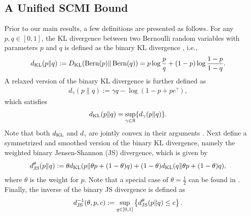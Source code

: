 \documentclass[onecolumn,romanappendices,10pt]{IEEEtran}
\newcommand{\RR}{{\mathbb{R}}}
\DeclareMathOperator{\Bernoulli}{Bern}
\begin{document}
	\subsection{A Unified SCMI Bound} \label{subsec:SCMI}
	Prior to our main results, a few definitions are presented as follows. For any $p,q \in [0,1]$, the KL divergence between two Bernoulli random variables with parameters $p$ and $q$ is defined as the binary KL divergence \cite{hellstrom2022new}, i.e.,
	\begin{equation}
		\begin{aligned}
			d_{\textnormal{KL}} (p \| q) := D_{\textnormal{KL}} (\Bernoulli(p) \| \Bernoulli(q)) = p \log \frac{p}{q} + (1 - p) \log \frac{1 - p}{1 - q}.
		\end{aligned}
	\end{equation}
	A relaxed version of the binary KL divergence is further defined as \cite{mcallester2013pac}
	\begin{equation}
		\begin{aligned}
			d_\gamma (p \| q) := \gamma q - \log ( 1 - p + p e^\gamma),
		\end{aligned}\label{eq:def-d_gamma}
	\end{equation}
	which satisfies
	\begin{equation} \label{eq:property_d_gamma}
		\begin{aligned}
			d_{\textnormal{KL}} (p \| q) = \sup_{\gamma \in \RR} \{d_\gamma (p \| q)\}.
		\end{aligned}
	\end{equation}
	Note that both $d_{\textnormal{KL}}$ and $d_{\gamma}$ are jointly convex in their arguments \cite{hellstrom2022new}. Next define a symmetrized and smoothed version of the binary KL divergence, namely the weighted binary Jensen-Shannon (JS) divergence, which is given by
	\begin{align}
		d^\theta_{\textnormal{JS}}(p \| q) := \theta d_{\textnormal{KL}}(p \| \theta p + (1 - \theta) q) + (1 - \theta) d_{\textnormal{KL}}(q \| \theta p + (1 - \theta) q), \label{eq:d_js}
	\end{align}
	where $\theta$ is the weight for $p$. Note that a special case of $\theta = \frac{1}{2}$ can be found in \cite{dongexactly}. Finally, the inverse of the binary JS divergence is defined as
	\begin{equation}
		\begin{aligned}
			d^{-1}_{\textnormal{JS}} (\theta, p, c) := \sup_{q \in [0,1]} \left\{ d^\theta_{\textnormal{JS}}(p \| q) \leq c \right\}.
		\end{aligned}\label{eq:inv-d_js}
	\end{equation}
	
\end{document}
